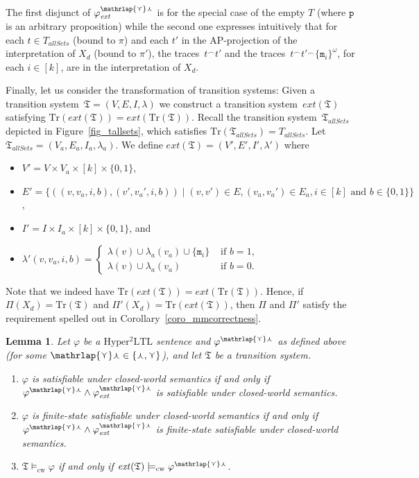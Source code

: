 \documentclass[dvipsnames,10pt,a4paper]{amsart}
\newtheorem{lem}[thm]{Lemma}
\theoremstyle{definition}
\theoremstyle{remark}
\renewcommand{\phi}{\varphi}
\newcommand{\set}[1]{\{#1\}}
\newcommand{\sohyltl}{\mathrm{Hyper^2LTL}\xspace}
\newcommand{\ap}[0]{\mathrm{AP}}
\newcommand{\unidisvar}{X_d}
\newcommand{\smallest}{\curlyvee}
\newcommand{\largest}{\curlywedge}
\newcommand{\smalar}{{\mathrlap{\curlyvee}\curlywedge}}
\newcommand{\tsys}{\mathfrak{T}}
\newcommand{\traces}{\mathrm{Tr}}
\newcommand{\proposition}{\texttt{p}}
\newcommand{\allsets}{{\mathit{allSets}}}
\newcommand{\cw}{\mathrm{cw}}
\newcommand{\marker}{\texttt{m}}
\newcommand{\merge}{^\smallfrown}
\newcommand{\extend}{\mathit{ext}}
\begin{document}
The first disjunct of $\phi_\extend^{\smalar}$ is for the special case of the empty $T$ (where $\proposition$ is an arbitrary proposition) while the second one expresses intuitively that for each $t \in T_\allsets$ (bound to $\pi$) and each $t'$ in the $\ap$-projection of the interpretation of $\unidisvar$ (bound to $\pi'$), the traces~$t\merge t'$ and the traces~$t\merge t'{}\merge \set{\marker_i}^\omega$, for each $i \in [k]$, are in the interpretation of $\unidisvar$.

Finally, let us consider the transformation of transition systems: Given a transition system~$\tsys = (V, E, I, \lambda)$ we construct a transition system~$\extend(\tsys)$ satisfying $\traces(\extend(\tsys)) = \extend(\traces(\tsys))$.
Recall the transition system~$\tsys_\allsets$ depicted in Figure~\ref{fig_tallsets}, which satisfies $\traces(\tsys_\allsets) = T_\allsets$. 
Let $\tsys_\allsets = (V_a, E_a, I_a,\lambda_a)$.
We define $\extend(\tsys) = (V', E', I', \lambda')$ where 
\begin{itemize}
    \item $V' = V \times V_a \times [k] \times\set{0,1} $,
    \item $E' = \set{((v,v_a,i,b),(v',v_a',i,b)) \mid (v,v') \in E, (v_a, v_a') \in E_a, i \in [k] \text{ and } b \in \set{0,1} }$,
    \item $I' = I \times I_a \times [k] \times\set{0,1} $, and
    \item $\lambda'(v,v_a,i,b) = 
    \begin{cases}
        \lambda(v) \cup \lambda_a(v_a) \cup \set{\marker_i} &\text{ if } b=1,\\
        \lambda(v) \cup \lambda_a(v_a)  &\text{ if } b=0.
    \end{cases}$
\end{itemize}
Note that we indeed have $
\traces(\extend(\tsys)) = \extend(\traces(\tsys))$.
Hence, if $\Pi(\unidisvar) = \traces(\tsys)$ and $\Pi'(\unidisvar) = \traces(\extend(\tsys))$, then $\Pi$ and $\Pi'$ satisfy the requirement spelled out in Corollary~\ref{coro_mmcorrectness}.

\begin{lem}
\label{lem_so2sofp}
Let $\phi$ be a $\sohyltl$ sentence and $\phi^{\smalar}$ as defined above (for some $\smalar \in \set{\largest,\smallest}$), and let $\tsys$ be a transition system.
\begin{enumerate}
    \item\label{lem_so2sofp_sat} $\phi$ is satisfiable under closed-world semantics if and only if $\phi^{\smalar} \wedge \phi_\extend^{\smalar}$ is satisfiable under closed-world semantics.
    \item\label{lem_so2sofp_fssat} $\phi$ is finite-state satisfiable under closed-world semantics if and only if $\phi^{\smalar} \wedge \phi_\extend^{\smalar}$ is finite-state satisfiable under closed-world semantics. 
    \item\label{lem_so2sofp_mc} $\tsys \models_\cw \phi$ if and only if $\extend(\tsys) \models_\cw \phi^{\smalar}$.  
\end{enumerate}
\end{lem}
\end{document}
